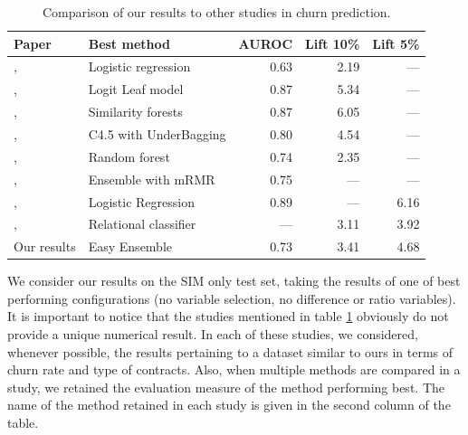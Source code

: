 \begin{table}
    \centering
    \begin{tabular}{llrrr}
        \toprule
        Paper & Best method & AUROC & Lift 10\% & Lift 5\%\\
        \midrule
        \citeauthor*{coussement2017comparative}, \citeyear{coussement2017comparative}
        & Logistic regression & 0.63 & 2.19 & ---  \\
        \citeauthor*{decaigny2018new}, \citeyear{decaigny2018new}
        & Logit Leaf model & 0.87 & 5.34 & ---  \\
        \citeauthor*{oskarsdottir2018time}, \citeyear{oskarsdottir2018time}
        & Similarity forests & 0.87 & 6.05 & ---  \\
        \citeauthor*{zhu2017empirical}, \citeyear{zhu2017empirical}
        & C4.5 with UnderBagging & 0.80 & 4.54 & ---  \\
        \citeauthor*{mitrovic2018operational}, \citeyear{mitrovic2018operational}
        & Random forest & 0.74 & 2.35 & ---  \\
        \citeauthor*{idris2014ensemble}, \citeyear{idris2014ensemble}
        & Ensemble with mRMR & 0.75 & ---  & ---  \\
        \citeauthor*{oskarsdottir2017social}, \citeyear{oskarsdottir2017social}
        & Logistic Regression & 0.89 & ---  & 6.16 \\
        \citeauthor*{verbeke2014social}, \citeyear{verbeke2014social}
        & Relational classifier & ---  & 3.11 & 3.92 \\
        \addlinespace
        Our results & Easy Ensemble & 0.73 & 3.41 & 4.68 \\
        \bottomrule
    \end{tabular}
    \caption{Comparison of our results to other studies in churn prediction.}
    \label{tab:comparison_sota}
\end{table}

We consider our results on the SIM only test set, taking the results of one of
best performing configurations (no variable selection, no difference or ratio
variables). It is important to notice that the studies mentioned in table
\ref{tab:comparison_sota} obviously do not provide a unique numerical result. In
each of these studies, we considered, whenever possible, the results pertaining
to a dataset similar to ours in terms of churn rate and type of contracts. Also,
when multiple methods are compared in a study, we retained the evaluation
measure of the method performing best. The name of the method retained in each
study is given in the second column of the table.

